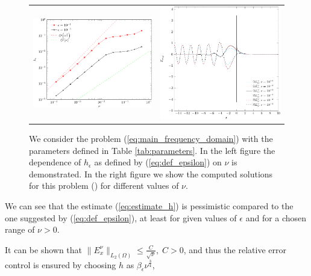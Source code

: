 \begin{figure}
\begin{tabular}{cc}
\includegraphics[height=0.32\textwidth]{pics_frequency_domain/h_nu.pdf}
&
\includegraphics[height=0.32\textwidth]{pics_frequency_domain/res_sol.pdf}
\end{tabular}
\caption{We consider the problem (\ref{eq:main_frequency_domain}) with the parameters 
defined in Table \ref{tab:parameters}. In the left figure the dependence of $h_{\epsilon}$ as defined by (\ref{eq:def_epsilon}) on $\nu$ is demonstrated.  
In the right figure we show the computed solutions for this problem () for different values of $\nu$. }
\label{fig:dependence}
\end{figure}
We can see that the estimate (\ref{eq:estimate_h}) is pessimistic compared to the one suggested by (\ref{eq:def_epsilon}), 
at least for given values of $\epsilon$ and for a chosen range of $\nu>0$.
\begin{remark}
It can be shown that $\|E^{\nu}_{x}\|_{L_{2}(\Omega)}\leq \frac{C}{\sqrt{\nu}},\; C>0$, 
and thus the relative error control
\bealn
 \leq \epsilon
\eealn
 is ensured by choosing $h$ as $\beta_{\epsilon}\nu^{\frac{3}{4}}$, 
\end{remark}

